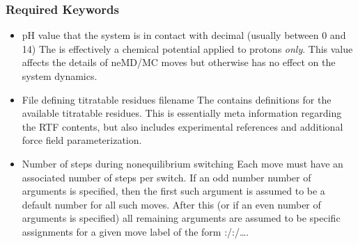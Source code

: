 \subsubsection{Required Keywords}
\begin{itemize}
\item {}
{pH value that the system is in contact with}
{decimal (usually between 0 and 14)}
{
The  is effectively a chemical potential applied to protons
  \emph{only}.
This value affects the details of neMD/MC moves but otherwise has no effect
  on the system dynamics.
}

\item {}
{File defining titratable residues}
{filename}
{
The  contains definitions for the available titratable 
  residues.
This is essentially meta information regarding the RTF contents, but also
  includes experimental references and additional force field parameterization.
}

\item {}
{Number of steps during nonequilibrium switching}
{
}
{
Each move must have an associated number of steps per switch. 
If an odd number number of arguments is specified, then the first such argument
  is assumed to be a default number for all such moves.
After this (or if an even number of arguments is specified) all remaining
  arguments are assumed to be specific assignments for a given move label
  of the form :/:/\ldots.
}
\end{itemize}


